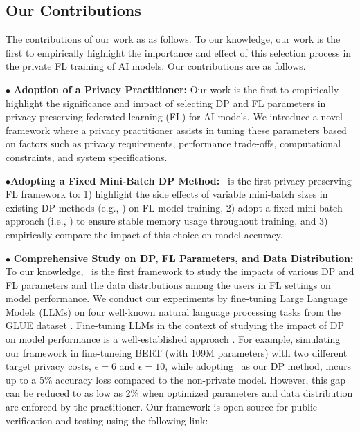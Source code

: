 \subsection{Our Contributions}
The contributions of our work as as follows. 
To our knowledge, our work is the first to empirically highlight the importance and effect of this selection process in the private FL training of AI models. 
%
Our contributions are as follows. 

\noindent$\bullet$ \textbf{Adoption of a Privacy Practitioner:} Our work is the first to empirically highlight the significance and impact of selecting DP and FL parameters in privacy-preserving federated learning (FL) for AI models. We introduce a novel framework where a privacy practitioner assists in tuning these parameters based on factors such as privacy requirements, performance trade-offs, computational constraints, and system specifications.

\noindent $\bullet$\textbf{Adopting a Fixed Mini-Batch DP Method:} \oursys~is the first privacy-preserving FL framework to: 1) highlight the side effects of variable mini-batch sizes in existing DP methods (e.g., \rdp) on FL model training, 2) adopt a fixed mini-batch approach (i.e., \sys) to ensure stable memory usage throughout training, and 3) empirically compare the impact of this choice on model accuracy.

\noindent $\bullet$ \textbf{Comprehensive Study on DP, FL Parameters, and Data Distribution:} To our knowledge, \oursys~is the first framework to study the impacts of various DP and FL parameters and the data distributions among the users in FL settings on model performance. We conduct our experiments by fine-tuning Large Language Models (LLMs) on four well-known natural language processing tasks from the GLUE dataset \cite{glue_2019}. Fine-tuning LLMs in the context of studying the impact of DP on model performance is a well-established approach \cite{behnia2022ew,yu2021differentially}. For example, simulating our framework in fine-tuneing BERT (with 109M parameters) \cite{devlin2018bert} with two different target privacy costs, $\epsilon = 6$ and $\epsilon = 10$, while adopting \sys~as our DP method, incurs up to a 5\% accuracy loss compared to the non-private model. However, this gap can be reduced to as low as 2\% when optimized parameters and data distribution are enforced by the practitioner. Our framework is open-source for public verification and testing using the following link:

